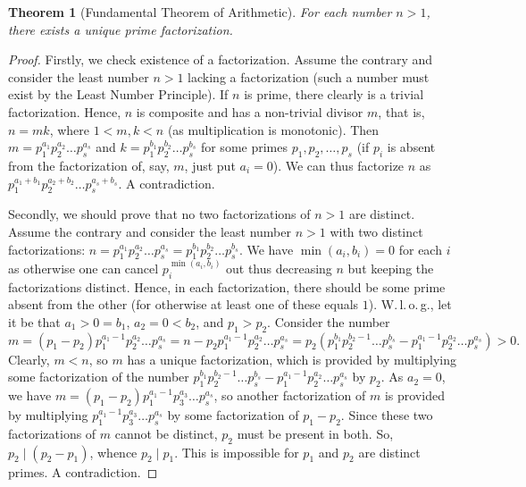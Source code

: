 \documentclass[12pt,notitlepage]{article}
\theoremstyle{plain}
\newtheorem{thm}{Theorem}[section]
\theoremstyle{definition}
\theoremstyle{plain}
\newcommand{\1}{\mathbf{1}}
\newcommand{\0}{\mathbf{0}}
\newcommand{\dvd}{\mathop{\mid}}
\begin{document}
\begin{thm}[Fundamental Theorem of Arithmetic]\label{L4:t14}
For each number $n > 1$, there exists a unique prime factorization.
\end{thm}
\begin{proof}
Firstly, we check existence of a factorization. Assume the contrary and consider the least number $n > 1$ lacking a factorization (such a number must exist by the Least Number Principle). If $n$ is prime, there clearly is a trivial factorization. Hence, $n$ is composite and has a non-trivial divisor $m$, that is, $n = m k$, where $1 < m, k < n$ (as multiplication is monotonic). Then $m = p_1^{a_1} p_2^{a_2} \ldots p_s^{a_s}$ and $k = p_1^{b_1} p_2^{b_2} \ldots p_s^{b_s}$ for some primes $p_1, p_2, \ldots, p_s$ (if $p_i$ is absent from the factorization of, say, $m$, just put $a_i = 0$). We can thus factorize $n$ as $p_1^{a_1 + b_1} p_2^{a_2 + b_2} \ldots p_s^{a_s + b_s}$. A contradiction.

Secondly, we should prove that no two factorizations of $n > 1$ are distinct. Assume the contrary and consider the least number $n > 1$ with two distinct factorizations:  $n = p_1^{a_1} p_2^{a_2} \ldots p_s^{a_s} = p_1^{b_1} p_2^{b_2} \ldots p_s^{b_s}$. We have $\min(a_i, b_i) = 0$ for each $i$ as otherwise one can cancel $p_i^{\min(a_i, b_i)}$ out thus decreasing $n$ but keeping the factorizations distinct. Hence, in each factorization, there should be some prime absent from the other (for otherwise at least one of these equals $1$). W.\,l.\,o.\,g., let it be that $a_1 > 0 = b_1$, $a_2 = 0 < b_2$, and $p_1 > p_2$. Consider the number
$$m = (p_1 - p_2)p^{a_1 - 1}_1 p_2^{a_2} \ldots p_s^{a_s} = n - p_2 p^{a_1 - 1}_1 p_2^{a_2} \ldots p_s^{a_s} = p_2 (p^{b_1}_1 p_2^{b_2 - 1} \ldots p_s^{b_s} - p^{a_1 - 1}_1 p_2^{a_2} \ldots p_s^{a_s}) > 0.$$
Clearly, $m < n$, so $m$ has a unique factorization, which is provided by multiplying some factorization of the number $p^{b_1}_1 p_2^{b_2 - 1} \ldots p_s^{b_s} - p^{a_1 - 1}_1 p_2^{a_2} \ldots p_s^{a_s}$ by $p_2$. As $a_2 = 0$, we have $m = (p_1 - p_2)p^{a_1 - 1}_1 p_3^{a_3} \ldots p_s^{a_s}$, so another factorization of $m$ is provided by multiplying $p^{a_1 - 1}_1 p_3^{a_3} \ldots p_s^{a_s}$ by some factorization of $p_1 - p_2$. Since these two factorizations of $m$ cannot be distinct, $p_2$ must be present in both. So, $p_2 \dvd (p_2 - p_1)$, whence $p_2 \dvd p_1$. This is impossible for $p_1$ and $p_2$ are distinct primes. A contradiction.
\end{proof}
\end{document}
